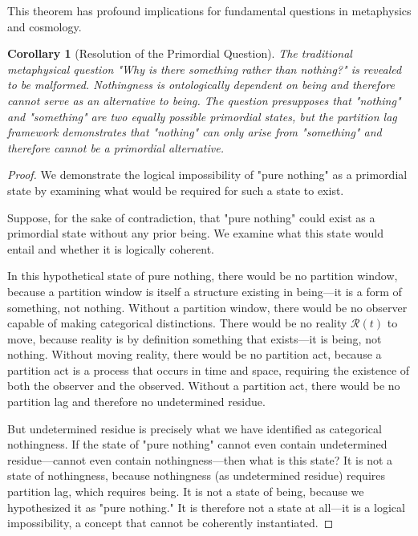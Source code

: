 \documentclass[12pt,a4paper]{article}
\newtheorem{corollary}[theorem]{Corollary}
\theoremstyle{definition}
\theoremstyle{remark}
\begin{document}
This theorem has profound implications for fundamental questions in metaphysics and cosmology.

\begin{corollary}[Resolution of the Primordial Question]
\label{cor:primordial_question}
The traditional metaphysical question "Why is there something rather than nothing?" is revealed to be malformed. Nothingness is ontologically dependent on being and therefore cannot serve as an alternative to being. The question presupposes that "nothing" and "something" are two equally possible primordial states, but the partition lag framework demonstrates that "nothing" can only arise from "something" and therefore cannot be a primordial alternative.
\end{corollary}

\begin{proof}
We demonstrate the logical impossibility of "pure nothing" as a primordial state by examining what would be required for such a state to exist.

Suppose, for the sake of contradiction, that "pure nothing" could exist as a primordial state without any prior being. We examine what this state would entail and whether it is logically coherent.

In this hypothetical state of pure nothing, there would be no partition window, because a partition window is itself a structure existing in being—it is a form of something, not nothing. Without a partition window, there would be no observer capable of making categorical distinctions. There would be no reality $\mathcal{R}(t)$ to move, because reality is by definition something that exists—it is being, not nothing. Without moving reality, there would be no partition act, because a partition act is a process that occurs in time and space, requiring the existence of both the observer and the observed. Without a partition act, there would be no partition lag and therefore no undetermined residue.

But undetermined residue is precisely what we have identified as categorical nothingness. If the state of "pure nothing" cannot even contain undetermined residue—cannot even contain nothingness—then what is this state? It is not a state of nothingness, because nothingness (as undetermined residue) requires partition lag, which requires being. It is not a state of being, because we hypothesized it as "pure nothing." It is therefore not a state at all—it is a logical impossibility, a concept that cannot be coherently instantiated.


\end{proof}
\end{document}
